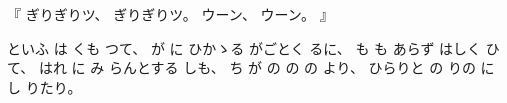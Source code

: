 %
『
ぎりぎりツ、
%
ぎりぎりツ。
%
ウーン、
%
ウーン。
』

%
といふ
は
くも
つて、
%
が
に
ひかゝる%
がごとく
るに、
%
も
も
あらず
はしく
ひて、
%
はれ
に%
み
らんとする
しも、
%
ち
が
の
の
の
より、
%
ひらりと
の
りの
に%
し
りたり。
